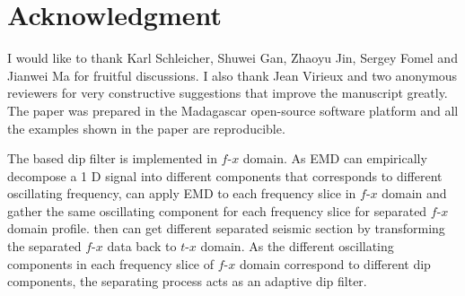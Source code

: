 \section{Acknowledgment}
I would like to thank Karl Schleicher, Shuwei Gan, Zhaoyu Jin, Sergey Fomel and Jianwei Ma for fruitful discussions. I also thank Jean Virieux and two anonymous reviewers for very constructive suggestions that improve the manuscript greatly. The paper was prepared in the Madagascar \cite[]{mada2013} open-source software platform and all the examples shown in the paper are reproducible.

The  based dip filter is implemented in $f$-$x$ domain. As EMD \cite[]{emd,yangkang2015enhemd,shuwei20152} can empirically decompose a 1 D signal into different components that corresponds to different oscillating frequency,  can apply EMD to each frequency slice in $f$-$x$ domain and gather the same oscillating component for each frequency slice for separated $f$-$x$ domain profile.  then can get different separated seismic section by transforming the separated $f$-$x$ data back to $t$-$x$ domain. As the different oscillating components in each frequency slice of $f$-$x$ domain correspond to different dip components, the separating process acts as an adaptive dip filter.  

